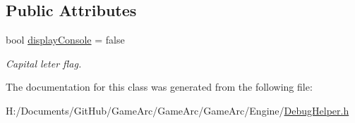 \subsection*{Public Attributes}
\begin{DoxyCompactItemize}
\item 
\hypertarget{class_debug_helper_a4353de086099b07a758df1ce5f44bed7}{bool \hyperlink{class_debug_helper_a4353de086099b07a758df1ce5f44bed7}{display\+Console} = false}\label{class_debug_helper_a4353de086099b07a758df1ce5f44bed7}

\begin{DoxyCompactList}\small\item\em Capital leter flag. \end{DoxyCompactList}\end{DoxyCompactItemize}


The documentation for this class was generated from the following file\+:\begin{DoxyCompactItemize}
\item 
H\+:/\+Documents/\+Git\+Hub/\+Game\+Arc/\+Game\+Arc/\+Game\+Arc/\+Engine/\hyperlink{_debug_helper_8h}{Debug\+Helper.\+h}\end{DoxyCompactItemize}
